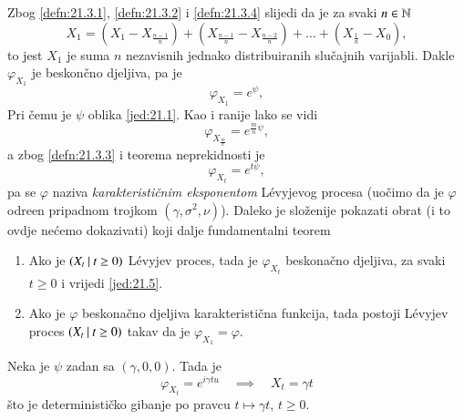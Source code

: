 Zbog \ref{defn:21.3.1}, \ref{defn:21.3.2} i \ref{defn:21.3.4} slijedi da je za svaki $n \in \mathbb{N}$
\begin{equation*}
    X_1 = (X_1 - X_{\frac{n - 1}{n}}) + (X_\frac{n - 1}{n} - X_\frac{n - 2}{n}) + \ldots + (X_\frac{1}{n} - X_0),
\end{equation*}
to jest $X_1$ je suma $n$ nezavisnih jednako distribuiranih slu\v cajnih varijabli.
Dakle $\varphi_{X_1}$ je beskon\v cno djeljiva, pa je
\begin{equation}    \label{jed:21.4}
    \varphi_{X_1} = e^\psi,
\end{equation}
Pri \v cemu je $\psi$ oblika \eqref{jed:21.1}.
Kao i ranije lako se vidi
\begin{equation}
    \varphi_{X_\frac{m}{n}} = e^{\frac{m}{n} \psi},
\end{equation}
a zbog \ref{defn:21.3.3} i teorema neprekidnosti je
\begin{equation}    \label{jed:21.5}
    \varphi_{X_t} = e^{t \psi},
\end{equation}
pa se $\varphi$ naziva \emph{karakteristi\v cnim eksponentom} L\' evyjevog procesa (uo\v cimo da je $\varphi$ odre\dj en pripadnom trojkom $(\gamma, \sigma^2, \nu)$).
Daleko je slo\v zenije pokazati obrat (i to ovdje ne\' cemo dokazivati) koji dalje fundamentalni teorem

\begin{tm}  \label{tm:21.6}
    \begin{enumerate}[label=(\alph*)]
        \item   \label{tm:21.6.1}
        Ako je $({X_t} \: | \: {t \geq 0})$ L\' evyjev proces, tada je $\varphi_{X_t}$ beskona\v cno djeljiva, za svaki $t \geq 0$ i vrijedi \eqref{jed:21.5}.
        \item   \label{tm:21.6.2}
        Ako je $\varphi$ beskona\v cno djeljiva karakteristi\v cna funkcija, tada postoji L\' evyjev proces $({X_t} \: | \: {t \geq 0})$ takav da je $\varphi_{X_1} = \varphi$.
    \end{enumerate}
\end{tm}

\begin{pr}  \label{pr:21.7}
    Neka je $\psi$ zadan sa $(\gamma, 0, 0)$.
    Tada je
    \begin{equation*}
        \varphi_{X_t} = e^{i \gamma t u} \quad \implies \quad X_t = \gamma t
    \end{equation*} 
    \v sto je deterministi\v cko gibanje po pravcu $t \mapsto \gamma t$, $t \geq 0$.
\end{pr}

